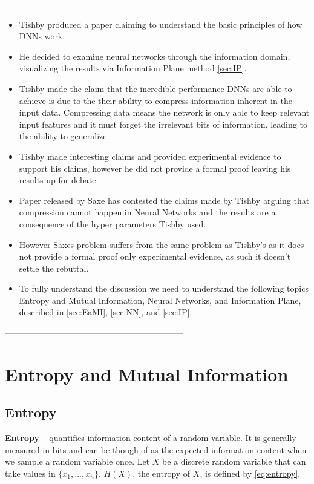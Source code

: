 \documentclass[dissertation.tex]{subfiles}
\begin{document}
---------------------------------------------------------------

\begin{itemize}
  \item{
      Tishby produced a paper \cite{TISHBY} claiming to understand the basic
      principles of how DNNs work. 
    }
  \item{
      He decided to examine neural networks through the information domain,
      visualizing the results via Information Plane method \autoref{sec:IP}.
    }
  \item{
      Tishby made the claim that the incredible performance DNNs are able to
      achieve is due to the their ability to compress information inherent in
      the input data. Compressing data means the network is only able to keep
      relevant input features and it must forget the irrelevant bits of
      information, leading to the ability to generalize.
    }
  \item{
      Tishby made interesting claims and provided experimental evidence to
      support his claims, however he did not provide a formal proof leaving his
      results up for debate.
    }
  \item{
      Paper released by Saxe has contested the claims made by Tishby arguing
      that compression cannot happen in Neural Networks and the results are a
      consequence of the hyper parameters Tishby used.     
    }
  \item{
      However Saxes problem suffers from the same problem as Tishby's as it does
      not provide a formal proof only experimental evidence, as such it doesn't
      settle the rebuttal.
    }
  \item{
      To fully understand the discussion we need to understand the following
      topics Entropy and Mutual Information, Neural Networks, and Information
      Plane, described in \autoref{sec:EaMI}, \autoref{sec:NN}, and
      \autoref{sec:IP}.
    }
\end{itemize}

---------------------------------------------------------------

\section{Entropy and Mutual Information}
\label{sec:EaMI}

\subsection{Entropy}
\textbf{Entropy} -- quantifies information content of a random variable. It is
generally measured in bits and can be though of as the expected information
content when we sample a random variable once. Let $X$ be a discrete random
variable that can take values in $\{x_1,...,x_n\}$. $H(X)$, the entropy of
$X$, is defined by \autoref{eq:entropy}.
\end{document}
